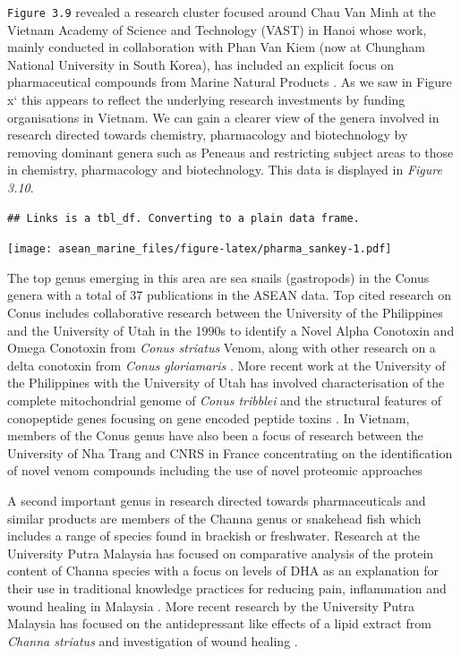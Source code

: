 \documentclass[]{book}
\theoremstyle{definition}
\theoremstyle{definition}
\theoremstyle{definition}
\theoremstyle{remark}
\begin{document}
\texttt{Figure\ 3.9} revealed a research cluster focused around Chau Van
Minh at the Vietnam Academy of Science and Technology (VAST) in Hanoi
whose work, mainly conducted in collaboration with Phan Van Kiem (now at
Chungham National University in South Korea), has included an explicit
focus on pharmaceutical compounds from Marine Natural Products
\citep[\citet{Thao_2015a}]{Van_Minh_2017, Quang_2011, Thao_2015}. As we
saw in Figure x` this appears to reflect the underlying research
investments by funding organisations in Vietnam. We can gain a clearer
view of the genera involved in research directed towards chemistry,
pharmacology and biotechnology by removing dominant genera such as
Peneaus and restricting subject areas to those in chemistry,
pharmacology and biotechnology. This data is displayed in \emph{Figure
3.10}.

\begin{verbatim}
## Links is a tbl_df. Converting to a plain data frame.
\end{verbatim}

\texttt{[image: asean\_marine\_files/figure-latex/pharma\_sankey-1.pdf]}

The top genus emerging in this area are sea snails (gastropods) in the
Conus genera with a total of 37 publications in the ASEAN data. Top
cited research on Conus includes collaborative research between the
University of the Philippines and the University of Utah in the 1990s to
identify a Novel Alpha Conotoxin and Omega Conotoxin from \emph{Conus
striatus} Venom, along with other research on a delta conotoxin from
\emph{Conus gloriamaris} \citep{Ramilo_1992, Shon_1994}. More recent
work at the University of the Philippines with the University of Utah
has involved characterisation of the complete mitochondrial genome of
\emph{Conus tribblei} and the structural features of conopeptide genes
focusing on gene encoded peptide toxins
\citep{Barghi_2015, Barghi_2015}. In Vietnam, members of the Conus genus
have also been a focus of research between the University of Nha Trang
and CNRS in France concentrating on the identification of novel venom
compounds including the use of novel proteomic approaches
\citep{Nguyen_2013, Nguyen_2014, Nguyen_2014a, Nguyen_2014b}

A second important genus in research directed towards pharmaceuticals
and similar products are members of the Channa genus or snakehead fish
which includes a range of species found in brackish or freshwater.
Research at the University Putra Malaysia has focused on comparative
analysis of the protein content of Channa species with a focus on levels
of DHA as an explanation for their use in traditional knowledge
practices for reducing pain, inflammation and wound healing in Malaysia
\citep{Zuraini_2006}. More recent research by the University Putra
Malaysia has focused on the antidepressant like effects of a lipid
extract from \emph{Channa striatus} and investigation of wound healing
\citep[Abdul\_Shukkoor\_2016;][]{Baie_2000, Mohamad_Isa_2016}.
\end{document}
